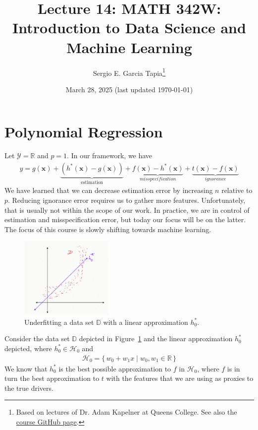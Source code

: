 \documentclass[12pt, a4paper]{article}
\title{Lecture 14: MATH 342W: Introduction to Data Science and Machine Learning}
\author{Sergio E. Garcia Tapia\thanks{Based on lectures of Dr. Adam Kapelner at Queens College.
See also the \href{https://github.com/kapelner/QC_MATH_342W_Spring_2025}{course GitHub page}.}}
\date{March 28, 2025 (last updated \today)}
\theoremstyle{definition}
\begin{document}
	\maketitle
	\section*{Polynomial Regression}
	Let $\mathcal{Y}=\mathbb{R}$ and $p=1$. In our framework, we have
	\begin{align*}
		y = g(\bm{x}) + 
		\underbrace{(h^*(\bm{x}) - g(\bm{x}))}_{{\text{estimation}}} + 
		\underbrace{f(\bm{x}) - h^*(\bm{x})}_{\textit{misspecification}} +
		\underbrace{t(\bm{x}) - f(\bm{x})}_{\textit{ignorance}}
	\end{align*}
	We have learned that we can decrease estimation error by increasing $n$ relative
	to $p$. Reducing ignorance error requires us to gather more features. Unfortunately,
	that is usually not within the scope of our work. In practice, we are in control
	of estimation and misspecification error, but today our focus will be on the latter.
	The focus of this course is slowly shifting towards machine learning.
	
	
	\begin{figure}
		\centering
		\includegraphics[width=0.4\textwidth]{underfit-with-linear-function}
		\caption{Underfitting a data set $\mathbb{D}$ with a linear approximation
		$h_0^*$.}
		\label{fig:underfit-D-with-linear}
	\end{figure}
	
	Consider the data set $\mathbb{D}$ depicted in Figure~\ref{fig:underfit-D-with-linear}
	and the linear approximation $h_0^*$ depicted, where $h_0^*\in \mathcal{H}_0$ and
	\begin{align*}
		\mathcal{H}_0 =\{\, w_0+w_1x \mid w_0,w_1\in \mathbb{R}\,\} 
	\end{align*}
	We know that $h_0^*$ is the best possible approximation to $f$ in $\mathcal{H}_0$, where
	$f$ is in turn the best approximation to $t$ with the features that we are using as proxies
	to the true drivers.
	
\end{document}
